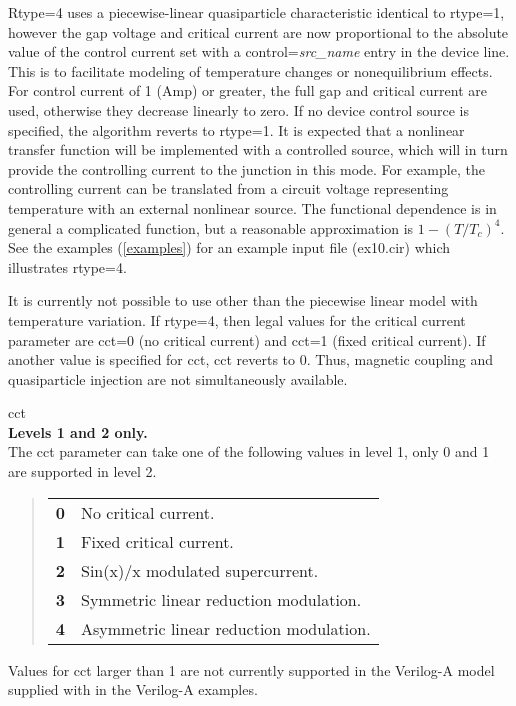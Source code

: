 \begin{description}
{\vt Rtype=4} uses a piecewise-linear quasiparticle characteristic
identical to {\vt rtype=1}, however the gap voltage and critical
current are now proportional to the absolute value of the control
current set with a {\vt control=}{\it src\_name} entry in the device
line.  This is to facilitate modeling of temperature changes or
nonequilibrium effects.  For control current of 1 (Amp) or greater,
the full gap and critical current are used, otherwise they decrease
linearly to zero.  If no device control source is specified, the
algorithm reverts to {\vt rtype=1}.  It is expected that a nonlinear
transfer function will be implemented with a controlled source, which
will in turn provide the controlling current to the junction in this
mode.  For example, the controlling current can be translated from a
circuit voltage representing temperature with an external nonlinear
source.  The functional dependence is in general a complicated
function, but a reasonable approximation is $1 - (T/T_c)^4$.  See the
examples (\ref{examples}) for an example input file ({\vt ex10.cir})
which illustrates {\vt rtype=4}.

It is currently not possible to use other than the piecewise linear
model with temperature variation.  If {\vt rtype=4}, then legal values
for the critical current parameter are {\vt cct=0} (no critical
current) and {\vt cct=1} (fixed critical current).  If another value
is specified for {\vt cct}, {\vt cct} reverts to 0.  Thus, magnetic
coupling and quasiparticle injection are not simultaneously available.

\item{\vt cct}\\
{\bf Levels 1 and 2 only.}\\
The {\vt cct} parameter can take one of the following values in level
1, only 0 and 1 are supported in level 2.
\begin{quote}
\begin{tabular}{ll}
\bf 0 & No critical current.\\
\bf 1 & Fixed critical current.\\
\bf 2 & Sin(x)/x modulated supercurrent.\\
\bf 3 & Symmetric linear reduction modulation.\\
\bf 4 & Asymmetric linear reduction modulation.\\
\end{tabular}
\end{quote}

Values for {\vt cct} larger than 1 are not currently supported in the
Verilog-A model supplied with {\WRspice} in the Verilog-A examples.


\end{description}
